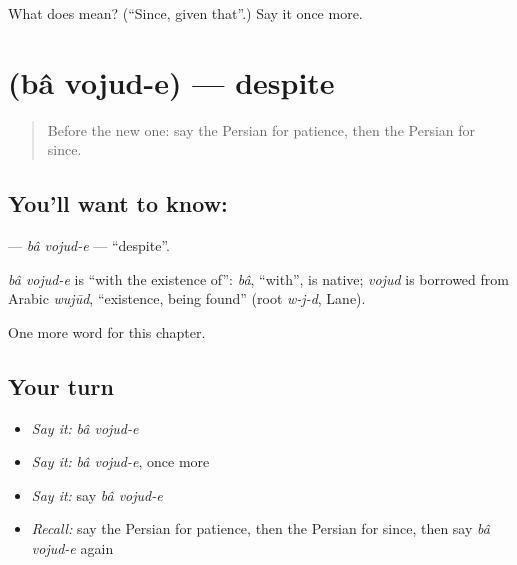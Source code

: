 \begin{tcolorbox}[breakable,colback=teal!4,colframe=teal!35!black,title={Before you move on}]
What does    mean? (\textquotedblleft{}Since, given that\textquotedblright{}.) Say it once more.
\end{tcolorbox}
\section[\texorpdfstring{\fa{با} \fa{وجود} (bâ vojud-e)}{با وجود (bâ vojud-e)}]{  (bâ vojud-e) — despite}

\label{lesson:FA-C270-ba-vojud-e}



\begin{quote}
Before the new one: say the Persian for patience, then the Persian for since.
\end{quote}

\subsection*{You'll want to know:  }
\textbf{ } — \emph{bâ vojud-e} — \textquotedblleft{}despite\textquotedblright{}.

\begin{cousinweb}
\emph{bâ vojud-e} is \textquotedblleft{}with the existence of\textquotedblright{}: \emph{bâ}, \textquotedblleft{}with\textquotedblright{}, is native; \emph{vojud} is borrowed from Arabic \emph{wujūd}, \textquotedblleft{}existence, being found\textquotedblright{} (root \emph{w-j-d}, Lane).
\end{cousinweb}

\begin{grammarlens}[title={What you've built}]
One more word for this chapter.
\end{grammarlens}

\subsection*{Your turn}
\begin{itemize}
\raggedright
  \item \emph{Say it:} \emph{bâ vojud-e}
  \item \emph{Say it:} \emph{bâ vojud-e}, once more
  \item \emph{Say it:} say \emph{bâ vojud-e}
  \item \emph{Recall:} say the Persian for patience, then the Persian for since, then say \emph{bâ vojud-e} again
\end{itemize}

